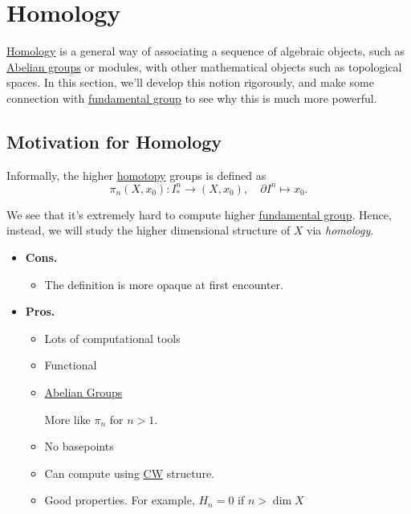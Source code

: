 \chapter{Homology}
\hyperref[def:homology-class]{Homology} is a general way of associating a sequence of algebraic objects, such as \hyperref[def:Abelian-group]{Abelian groups} or modules, with other  mathematical objects such as topological spaces. In this section, we'll develop this notion rigorously, and make some connection with \hyperref[def:fundamental-group]{fundamental group} to see why this is much more powerful.

\section{Motivation for Homology}
Informally, the higher \hyperref[def:homotopy]{homotopy} groups is defined as
\[
	\pi _{n} (X, x_0)\colon I^n_\ast \to (X, x_0),\quad \partial I^n \mapsto x_0.
\]
\begin{figure}[H]
	\centering
	\label{fig:higher-homotopy-group-dim2}
\end{figure}


We see that it's extremely hard to compute higher \hyperref[def:fundamental-group]{fundamental group}. Hence, instead, we will study the higher dimensional structure of \(X\) via \emph{homology}.

\begin{itemize}
	\item \textbf{Cons.}
	      \begin{itemize}
		      \item The definition is more opaque at first encounter.
	      \end{itemize}
	\item \textbf{Pros.}
	      \begin{itemize}
		      \item Lots of computational tools
		      \item Functional
		      \item \hyperref[def:Abelian-group]{Abelian Groups}
		            \begin{remark}
			            More like \(\pi _n\) for \(n>1\).
		            \end{remark}
		      \item No basepoints
		      \item Can compute using \hyperref[def:CW-subcomplex]{CW} structure.
		      \item Good properties. For example, \(H_{n} = 0\) if \(n > \dim X\)
	      \end{itemize}
\end{itemize}


